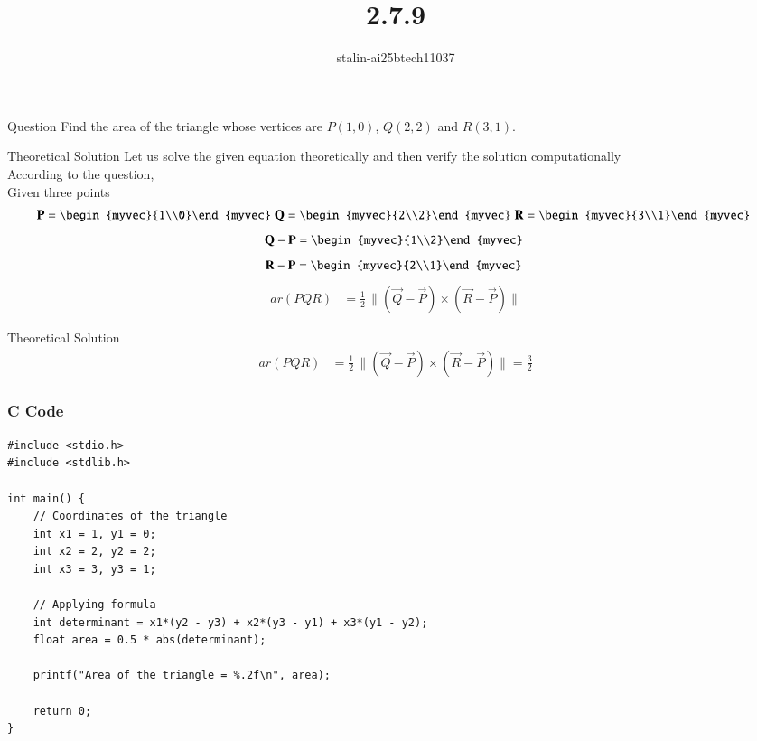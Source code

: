 \documentclass{beamer}
\title %
{2.7.9}
\author %
{stalin-ai25btech11037}
\begin{document}
\frame{\titlepage}
\begin{frame}{Question}
Find the area of the triangle whose vertices are $P(1,0)$, $Q(2,2)$ and $R(3,1)$.\\ 
\end{frame}
\begin{frame}{Theoretical Solution}
Let us solve the given equation theoretically and then verify the solution computationally \\
According to the question, \\
Given three points\\
\begin{align}
  \vec{P}=\begin{myvec}{1\\0}\end{myvec}\;
  \vec{Q}=\begin{myvec}{2\\2}\end{myvec}\;
  \vec{R}=\begin{myvec}{3\\1}\end{myvec}\
   \end{align}
   \begin{align}
 \vec{Q}-\vec{P}=\begin{myvec}{1\\2}\end{myvec}\
\end{align}
\begin{align}
  \vec{R}-\vec{P}=\begin{myvec}{2\\1}\end{myvec}\
\end{align}
\begin{align}
ar(PQR) &= \frac{1}{2} \, \|(\vec{Q} - \vec{P}) \times (\vec{R} - \vec{P}) \|
\end{align}

\end{frame}
\begin{frame}{Theoretical Solution}
\begin{align}
ar(PQR) &= \frac{1}{2} \, \|(\vec{Q} - \vec{P}) \times (\vec{R} - \vec{P}) \|=\frac{3}{2}
\end{align}
\end{frame}
\begin{frame}[fragile]
    \frametitle{C Code}
    \begin{lstlisting}
#include <stdio.h>
#include <stdlib.h>

int main() {
    // Coordinates of the triangle
    int x1 = 1, y1 = 0;
    int x2 = 2, y2 = 2;
    int x3 = 3, y3 = 1;

    // Applying formula
    int determinant = x1*(y2 - y3) + x2*(y3 - y1) + x3*(y1 - y2);
    float area = 0.5 * abs(determinant);

    printf("Area of the triangle = %.2f\n", area);

    return 0;
}

     \end{lstlisting}
\end{frame}
\end{document}
